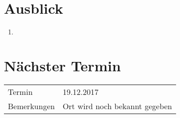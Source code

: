 \documentclass[11pt, a4paper,oneside]{scrartcl}
\begin{document}
	\section{Ausblick}
	\begin{enumerate}
		\item 
	\end{enumerate}
	
	\section{Nächster Termin}
	\begin{tabu} to \linewidth {l X }
		\toprule
		Termin & 19.12.2017  \\
		Bemerkungen & Ort wird noch bekannt gegeben  \\
		\bottomrule
	\end{tabu}
	
\end{document}
